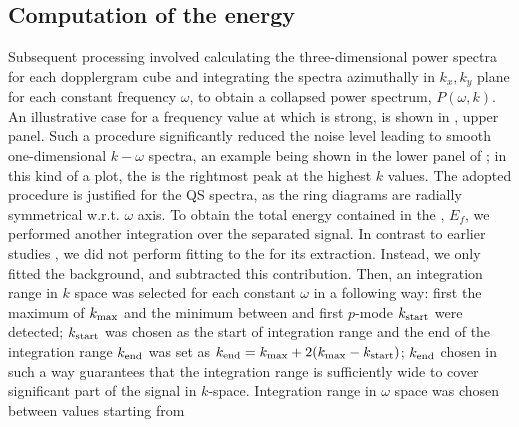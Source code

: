 \documentclass{aa}
\begin{document}
%
\subsection{Computation of the \fff
energy}

Subsequent processing involved calculating the 
three-dimensional
power spectra for each dopplergram cube and 
integrating
the spectra azimuthally in $k_x, k_y$ plane for each constant frequency $\omega$,
to obtain a collapsed power spectrum, $P(\omega,k)$. An illustrative case for a frequency
value at which \fff is strong, is shown in 
,
upper panel.
Such a procedure
significantly reduced the noise level leading to smooth one-dimensional $k-\omega$ spectra,
an example being shown in the lower panel of ;
in this kind of a plot, the \fff is the rightmost peak at the highest $k$ values.
The adopted procedure
is justified for the 
QS
spectra, as the ring diagrams are radially symmetrical w.r.t. $\omega$ axis. 
To obtain the total energy contained in the \fffns, $E_f$, we
performed another integration over the separated \fff signal.
In contrast to earlier studies \citep{SRB16,Waidele22}, we
did not perform fitting to the \fff for its extraction. 
Instead, we only fitted the background, and subtracted this 
contribution.
Then,
an integration range in $k$ space was selected for each constant $\omega$ in a following way: first the maximum of \fff $k_{\rm max}$ and the minimum between \fff and first $p$-mode $k_{\rm start}$ were detected; $k_{\rm start}$ was chosen as the start of integration range and the end of the integration range $k_{\rm end}$ was set as $k_{\rm end}=k_{\rm max}+2(k_{\rm max}-k_{\rm start})$; $k_{\rm end}$ chosen in such a way guarantees that the integration range is sufficiently wide to cover significant part of the \fff 
signal in $k$-space.
Integration range in $\omega$ space was chosen between values starting from 
\end{document}
